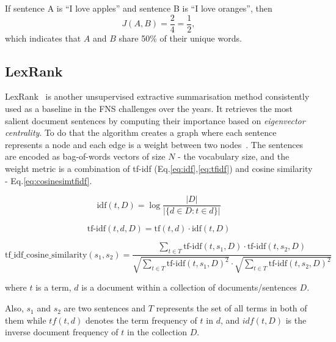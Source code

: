 \begin{example}\label{ex:jaccard}
    If sentence A is ``I love apples'' and sentence B is ``I love oranges'', then
    \[
        J(A,B)=\frac{2}{4}=\frac{1}{2},
    \]
    which indicates that $A$ and $B$ share 50\% of their unique words.
\end{example}


\subsection{LexRank}\label{subsec:lexrank}
LexRank~\cite{Erkan2004LexRankGC} is another unsupervised extractive summarisation method consistently used as a baseline in the FNS challenges over the years.
It retrieves the most salient document sentences by computing their importance based on \emph{eigenvector centrality}.
To do that the algorithm creates a graph where each sentence represents a node and each edge is a weight between two nodes~\cite{Shearing2020AutomatedTS}.
The sentences are encoded as bag-of-words vectors of size $N$ - the vocabulary size, and the weight metric is a combination of tf-idf (Eq.\ref{eq:idf},\ref{eq:tfidf}) and cosine similarity - Eq.\ref{eq:cosinesimtfidf}.

\begin{equation}
    \text{idf}(t, D) = \log \frac{|D|}{|\{d \in D : t \in d\}|} \label{eq:idf}
\end{equation}

\begin{equation}
    \text{tf-idf}(t, d, D) = \text{tf}(t, d) \cdot \text{idf}(t, D)
    \label{eq:tfidf}
\end{equation}

\begin{equation}
    \text{tf\_idf\_cosine\_similarity}(s_1, s_2) = \frac{\sum_{t \in T} \text{tf-idf}(t, s_1, D) \cdot \text{tf-idf}(t, s_2, D)}{ \sqrt{\sum_{t \in T} \text{tf-idf}(t, s_1, D)^2} \cdot \sqrt{\sum_{t \in T} \text{tf-idf}(t, s_2, D)^2}}
    \label{eq:cosinesimtfidf}
\end{equation}

where $t$ is a term, $d$ is a document within a collection of documents/sentences $D$.

Also, $s_1$ and $s_2$ are two sentences and $T$ represents the set of all terms in both of them while $tf(t, d)$ denotes the term frequency of $t$ in $d$, and $idf(t, D)$ is the inverse document frequency of $t$ in the collection $D$.

